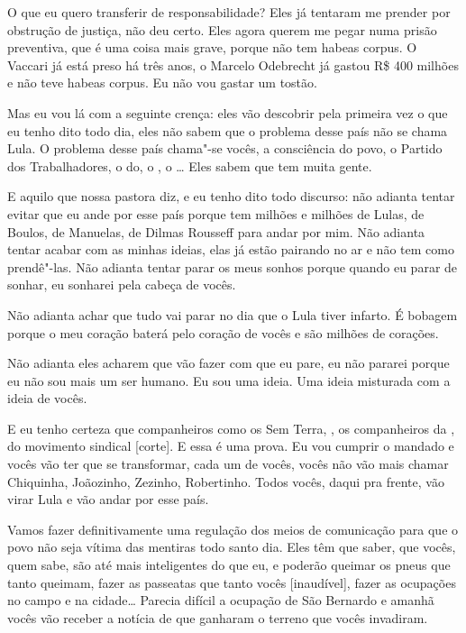 O que eu quero transferir de responsabilidade? Eles já tentaram me
prender por obstrução de justiça, não deu certo. Eles agora querem me
pegar numa prisão preventiva, que é uma coisa mais grave, porque não tem
habeas corpus. O Vaccari já está preso há três anos, o Marcelo Odebrecht
já gastou R\$ 400 milhões e não teve habeas corpus. Eu não vou gastar um
tostão.

Mas eu vou lá com a seguinte crença: eles vão descobrir pela
primeira vez o que eu tenho dito todo dia, eles não sabem que o problema
desse país não se chama Lula. O problema desse país chama"-se vocês, a
consciência do povo, o Partido dos Trabalhadores, o do, o , o
\ldots{} Eles sabem que tem muita gente.

E aquilo que nossa pastora diz, e eu tenho dito todo discurso: não
adianta tentar evitar que eu ande por esse país porque tem milhões e
milhões de Lulas, de Boulos, de Manuelas, de Dilmas Rousseff para andar
por mim. Não adianta tentar acabar com as minhas ideias, elas já estão
pairando no ar e não tem como prendê"-las. Não adianta tentar parar os
meus sonhos porque quando eu parar de sonhar, eu sonharei pela cabeça de
vocês.

Não adianta achar que tudo vai parar no dia que o Lula tiver
infarto. É bobagem porque o meu coração baterá pelo coração de vocês e
são milhões de corações.

Não adianta eles acharem que vão fazer com que eu pare, eu não
pararei porque eu não sou mais um ser humano. Eu sou uma ideia. Uma
ideia misturada com a ideia de vocês.

E eu tenho certeza que companheiros como os Sem Terra, , os
companheiros da , do movimento sindical [corte]. E essa é uma
prova. Eu vou cumprir o mandado e vocês vão ter que se transformar, cada
um de vocês, vocês não vão mais chamar Chiquinha, Joãozinho, Zezinho,
Robertinho. Todos vocês, daqui pra frente, vão virar Lula e vão andar
por esse país.

Vamos fazer definitivamente uma regulação dos meios de comunicação
para que o povo não seja vítima das mentiras todo santo dia. Eles têm
que saber, que vocês, quem sabe, são até mais inteligentes do que eu, e
poderão queimar os pneus que tanto queimam, fazer as passeatas que tanto
vocês [inaudível], fazer as ocupações no campo e na cidade\ldots{}
Parecia difícil a ocupação de São Bernardo e amanhã vocês vão receber a
notícia de que ganharam o terreno que vocês invadiram.

